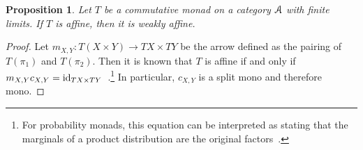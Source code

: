 \documentclass[a4paper,UKenglish,numberwithinsect,cleveref, autoref, thm-restate]{lipics-v2021}
\theoremstyle{plain} %
\newtheorem{myproposition}[mytheorem]{Proposition}
\theoremstyle{definition} %
\begin{document}
\begin{myproposition}\label{prop:every affine commutative monad is weakly affine}
	Let $T$ be a commutative monad on a category $\mathcal{A}$ with finite limits. 
	If $T$ is affine, then it is weakly affine.
\end{myproposition}

\begin{proof}
	Let $m_{X,Y} : T(X \times Y) \longrightarrow TX \times TY$
	be the arrow defined as the pairing of $T(\pi_1)$ and $T(\pi_2)$.
	Then it is known that $T$ is affine if and only if $m_{X,Y} c_{X,Y} = \operatorname{ id}_{TX \times TY}$~\cite[Lemma~4.2(i)]{Jacobs1994}.\footnote{For probability monads, this equation can be interpreted as stating that the marginals of a product distribution are the original factors~\cite{Fritz2018}.}
	In particular, $c_{X,Y}$ is a split mono and therefore mono.


\end{proof}
\end{document}
